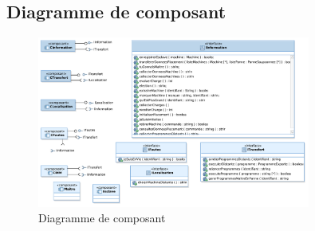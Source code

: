 \subsection{Diagramme de composant}

  \begin{figure}[h!]
    \centering
    \includegraphics[angle=270,width=0.8\textwidth]{img/analyse_DiagrammeComposant.pdf}
    \caption{Diagramme de composant}
  \end{figure}
